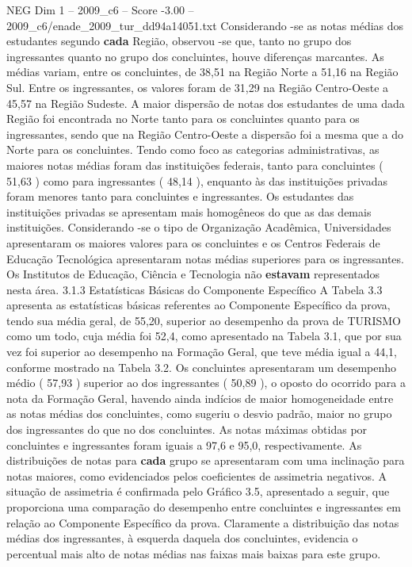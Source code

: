 \begin{textsample}{NEG Dim 1 – 2009\_c6 – Score -3.00 – 2009\_c6/enade\_2009\_tur\_dd94a14051.txt}
Considerando -se as notas médias dos estudantes segundo \textbf{cada} Região, observou -se que, tanto no grupo dos ingressantes quanto no grupo dos concluintes, houve diferenças marcantes.
As médias variam, entre os concluintes, de 38,51 na Região Norte a 51,16 na Região Sul.
Entre os ingressantes, os valores foram de 31,29 na Região Centro-Oeste a 45,57 na Região Sudeste.
A maior dispersão de notas dos estudantes de uma dada Região foi encontrada no Norte tanto para os concluintes quanto para os ingressantes, sendo que na Região Centro-Oeste a dispersão foi a mesma que a do Norte para os concluintes.
Tendo como foco as categorias administrativas, as maiores notas médias foram das instituições federais, tanto para concluintes ( 51,63 ) como para ingressantes ( 48,14 ), enquanto às das instituições privadas foram menores tanto para concluintes e ingressantes.
Os estudantes das instituições privadas se apresentam mais homogêneos do que as das demais instituições.
Considerando -se o tipo de Organização Acadêmica, Universidades apresentaram os maiores valores para os concluintes e os Centros Federais de Educação Tecnológica apresentaram notas médias superiores para os ingressantes.
Os Institutos de Educação, Ciência e Tecnologia não \textbf{estavam} representados nesta área. 3.1.3 Estatísticas Básicas do Componente Específico A Tabela 3.3 apresenta as estatísticas básicas referentes ao Componente Específico da prova, tendo sua média geral, de 55,20, superior ao desempenho da prova de TURISMO como um todo, cuja média foi 52,4, como apresentado na Tabela 3.1, que por sua vez foi superior ao desempenho na Formação Geral, que teve média igual a 44,1, conforme mostrado na Tabela 3.2.
Os concluintes apresentaram um desempenho médio ( 57,93 ) superior ao dos ingressantes ( 50,89 ), o oposto do ocorrido para a nota da Formação Geral, havendo ainda indícios de maior homogeneidade entre as notas médias dos concluintes, como sugeriu o desvio padrão, maior no grupo dos ingressantes do que no dos concluintes.
As notas máximas obtidas por concluintes e ingressantes foram iguais a 97,6 e 95,0, respectivamente.
As distribuições de notas para \textbf{cada} grupo se apresentaram com uma inclinação para notas maiores, como evidenciados pelos coeficientes de assimetria negativos.
A situação de assimetria é confirmada pelo Gráfico 3.5, apresentado a seguir, que proporciona uma comparação do desempenho entre concluintes e ingressantes em relação ao Componente Específico da prova.
Claramente a distribuição das notas médias dos ingressantes, à esquerda daquela dos concluintes, evidencia o percentual mais alto de notas médias nas faixas mais baixas para este grupo.

\end{textsample}
